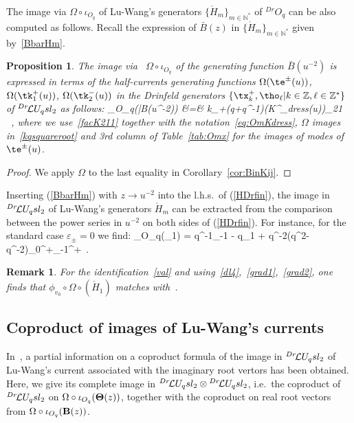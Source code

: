 \documentclass[11pt]{amsart}
\numberwithin{equation}{section}
\newtheorem{prop}[thm]{Proposition}
\newtheorem{rem}[thm]{Remark}
\numberwithin{equation}{section}
\begin{document}
\medskip






The image via $\Omega \circ \iota_{O_q}$ of Lu-Wang's generators $\{{\acute H}_m\}_{m\in{\mathbb N}^*}$ of $^{Dr}O_q$ can be also computed as follows. Recall the expression of $\bar B(z)$ in $\{{\acute H}_m\}_{m\in{\mathbb N}^*}$ given by~\eqref{BbarHm}.
\begin{prop}\label{prop:HmOqUq}
	The image via \ $\Omega \circ\iota_{O_q}$ of the generating function ${\bar  B}(u^{-2})$ is expressed in terms of the half-currents generating functions $\Omega(\te^{\pm}(u))$,  $\Omega(\tk_{1}^{+}(u))$,  $\Omega(\tk_{2}^{-}(u))$ in the Drinfeld generators $\{\tx_k^{+}, \tho_{\ell}|k\in{\mathbb Z},\ell\in{\mathbb Z}^*\}$ of  ${}^{Dr}\!\mathcal{L} U_q sl_2 $ as follows:
	\beqa
	\Omega \circ \iota_{O_q}({\bar B}(u^{-2})) &=& k_+(q+q^{-1})({\bold K}^\Omega_{dress}(u))_{21} \ 
	 ,\label{HDrfin} 
	\eeqa
	where we use~\eqref{facK211}  together with the notation~\eqref{eq:OmKdress}, 
    $\Omega$ images in~\eqref{kqsquareroot} and 3rd column of Table~\ref{tab:Omx} for the images of modes of $\te^{\pm}(u)$.
\end{prop}
\begin{proof}
We apply $\Omega$  to the last equality in  Corollary~\ref{cor:BinKij}.
\end{proof}
Inserting (\ref{BbarHm}) with $z\rightarrow u^{-2}$ into the l.h.s.\ of  (\ref{HDrfin}), the image in ${}^{Dr}\!\mathcal{L} U_q sl_2$ of Lu-Wang's generators $\acute{H}_m$ can be extracted from the comparison between the power series in $u^{-2}$ on both sides of (\ref{HDrfin}). For instance, for the standard case $\varepsilon_\pm=0$ we find:
%
\beqa
\Omega \circ \iota_{O_q}(_1) =  q^{-1}\tho_{-1} - q\tho_1 + q^{-2}(q^2-q^{-2})\tx_0^+\tx_{-1}^+\ .\label{eq:Hcute1}
\eeqa 
\begin{rem} For the identification~\eqref{val} and using~\eqref{dl4},~\eqref{grad1},~\eqref{grad2}, one finds that $\phi_{v_0}\circ \Omega \circ (\acute{H}_1)$  matches with~\cite[Lem.\,4.4 for $C=1$, $c_1=q^{-2}$]{P24}.
\end{rem}

\subsection{Coproduct of images of Lu-Wang's currents}
 In~\cite{P24}, a partial information on a coproduct formula of the image in ${}^{Dr}\!\mathcal{L} U_q sl_2$ of Lu-Wang's current associated with the imaginary root vertors has been obtained. Here, we give its complete image in ${}^{Dr}\!\mathcal{L} U_q sl_2 \otimes {}^{Dr}\!\mathcal{L} U_q sl_2 $, i.e.\ the coproduct of ${}^{Dr}\!\mathcal{L} U_q sl_2$ on $\Omega \circ \iota_{O_q}({\bf \Theta}(z))$, together with the coproduct on real root vectors from $\Omega \circ \iota_{O_q}({\bf B}(z))$. 
\end{document}
